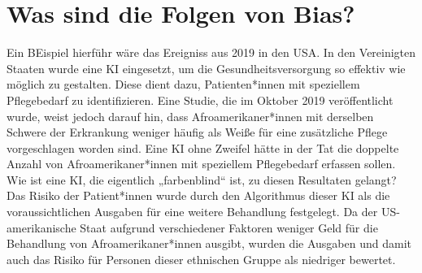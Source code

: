 \section{Was sind die Folgen von Bias?}
Ein BEispiel hierführ wäre das Ereigniss aus 2019 in den USA.
In den Vereinigten Staaten wurde eine KI eingesetzt, um die 
Gesundheitsversorgung so effektiv wie möglich zu gestalten. 
Diese dient dazu, Patienten*innen mit speziellem Pflegebedarf zu 
identifizieren. 
Eine Studie, die im Oktober 2019 veröffentlicht wurde, weist jedoch darauf hin, 
dass Afroamerikaner*innen mit derselben Schwere der Erkrankung weniger 
häufig als Weiße für eine zusätzliche Pflege vorgeschlagen worden sind. 
Eine KI ohne Zweifel hätte in der Tat die doppelte Anzahl von Afroamerikaner*innen mit 
speziellem Pflegebedarf erfassen sollen. Wie ist eine KI, die eigentlich 
„farbenblind“ ist, zu diesen Resultaten gelangt?
Das Risiko der Patient*innen wurde durch den Algorithmus 
dieser KI als die voraussichtlichen Ausgaben für eine weitere Behandlung
festgelegt. Da der US-amerikanische Staat aufgrund verschiedener Faktoren weniger Geld für die 
Behandlung von Afroamerikaner*innen ausgibt, wurden die Ausgaben und damit auch das 
Risiko für Personen dieser ethnischen Gruppe als niedriger bewertet.
\citep{Folgen_Bias}